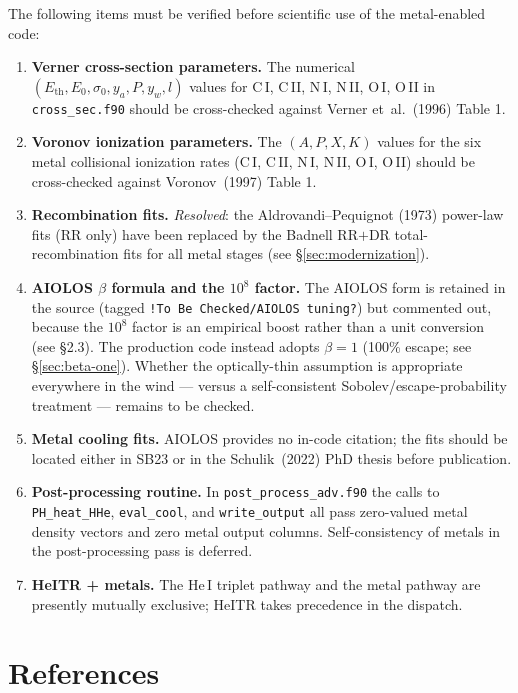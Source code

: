 \documentclass[english,a4paper]{my_memo}
\begin{document}
The following items must be verified before scientific use of the
metal-enabled code:
\begin{enumerate}
  \item \textbf{Verner cross-section parameters.}  The numerical
    \((E_\mathrm{th}, E_0, \sigma_0, y_a, P, y_w, l)\) values for
    C\,I, C\,II, N\,I, N\,II, O\,I, O\,II in \texttt{cross\_sec.f90}
    should be cross-checked against Verner et~al.~(1996) Table 1.
  \item \textbf{Voronov ionization parameters.}  The
    \((A, P, X, K)\) values for the six metal collisional ionization
    rates (C\,I, C\,II, N\,I, N\,II, O\,I, O\,II) should be
    cross-checked against Voronov~(1997) Table 1.
  \item \textbf{Recombination fits.}  \emph{Resolved}: the
    Aldrovandi--Pequignot (1973) power-law fits (RR only) have been
    replaced by the Badnell RR$+$DR total-recombination fits for all
    metal stages (see \S\ref{sec:modernization}).
  \item \textbf{AIOLOS $\beta$ formula and the $10^{8}$ factor.}
    The AIOLOS form is retained in the source (tagged
    \texttt{!To Be Checked/AIOLOS tuning?}) but commented out, because
    the \(10^{8}\) factor is an empirical boost rather than a unit
    conversion (see \S2.3).  The production code instead adopts
    \(\beta = 1\) (100\% escape; see \S\ref{sec:beta-one}).  Whether the
    optically-thin assumption is appropriate everywhere in the wind ---
    versus a self-consistent Sobolev/escape-probability treatment ---
    remains to be checked.
  \item \textbf{Metal cooling fits.}  AIOLOS provides no in-code
    citation; the fits should be located either in SB23 or in the
    Schulik~(2022) PhD thesis before publication.
  \item \textbf{Post-processing routine.}  In
    \texttt{post\_process\_adv.f90} the calls to \texttt{PH\_heat\_HHe},
    \texttt{eval\_cool}, and \texttt{write\_output} all pass
    zero-valued metal density vectors and zero metal output columns.
    Self-consistency of metals in the post-processing pass is
    deferred.
  \item \textbf{HeITR + metals.}  The He\,I triplet pathway and the
    metal pathway are presently mutually exclusive; HeITR takes
    precedence in the dispatch.
\end{enumerate}

\section{References}
\end{document}
